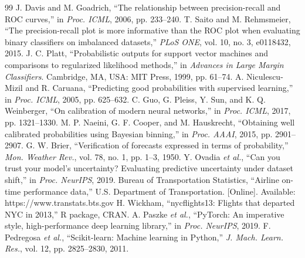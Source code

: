 \documentclass[conference]{IEEEtran}
\begin{document}
\begin{thebibliography}{99}
 J. Davis and M. Goadrich, ``The relationship between precision-recall and ROC curves,'' in \emph{Proc. ICML}, 2006, pp. 233--240.
 T. Saito and M. Rehmsmeier, ``The precision-recall plot is more informative than the ROC plot when evaluating binary classifiers on imbalanced datasets,'' \emph{PLoS ONE}, vol. 10, no. 3, e0118432, 2015.
 J. C. Platt, ``Probabilistic outputs for support vector machines and comparisons to regularized likelihood methods,'' in \emph{Advances in Large Margin Classifiers}. Cambridge, MA, USA: MIT Press, 1999, pp. 61--74.
 A. Niculescu-Mizil and R. Caruana, ``Predicting good probabilities with supervised learning,'' in \emph{Proc. ICML}, 2005, pp. 625--632.
 C. Guo, G. Pleiss, Y. Sun, and K. Q. Weinberger, ``On calibration of modern neural networks,'' in \emph{Proc. ICML}, 2017, pp. 1321--1330.
 M. P. Naeini, G. F. Cooper, and M. Hauskrecht, ``Obtaining well calibrated probabilities using Bayesian binning,'' in \emph{Proc. AAAI}, 2015, pp. 2901--2907.
 G. W. Brier, ``Verification of forecasts expressed in terms of probability,'' \emph{Mon. Weather Rev.}, vol. 78, no. 1, pp. 1--3, 1950.
 Y. Ovadia \emph{et al.}, ``Can you trust your model's uncertainty? Evaluating predictive uncertainty under dataset shift,'' in \emph{Proc. NeurIPS}, 2019.
 Bureau of Transportation Statistics, ``Airline on-time performance data,'' U.S. Department of Transportation. [Online]. Available: https://www.transtats.bts.gov
 H. Wickham, ``nycflights13: Flights that departed NYC in 2013,'' R package, CRAN.
 A. Paszke \emph{et al.}, ``PyTorch: An imperative style, high-performance deep learning library,'' in \emph{Proc. NeurIPS}, 2019.
 F. Pedregosa \emph{et al.}, ``Scikit-learn: Machine learning in Python,'' \emph{J. Mach. Learn. Res.}, vol. 12, pp. 2825--2830, 2011.
\end{thebibliography}
\end{document}
